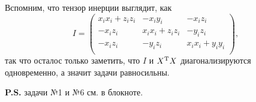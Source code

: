 Вспомним, что тензор инерции выглядит, как
\begin{equation*}
    I = \begin{pmatrix}
        x_i x_i + z_i z_i & - x_i y_i & - x_i z_i \\
        - x_i z_i & x_i x_i + z_i z_i & - y_i z_i \\
        -x_i z_i & -y_i z_i & x_i x_i + y_i y_i \\
    \end{pmatrix},
\end{equation*}
так что осталос только заметить, что $I$ и $X^{\text{T}} X$ диагонализируются одновременно, а значит задачи равносильны. 









\phantom{42}


\noindent
\textbf{P.S.} задачи №1 и №6 см. в блокноте.